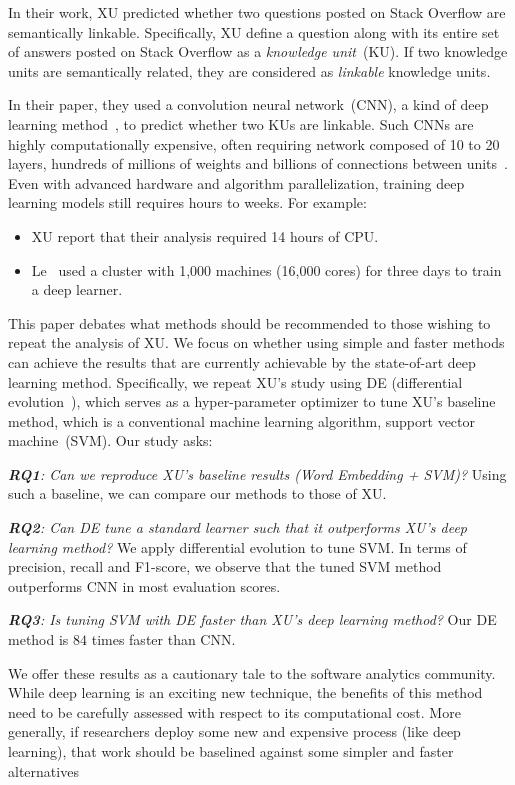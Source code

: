 \documentclass[sigconf]{acmart}
\theoremstyle{break}
\newcommand{\bi}{\begin{itemize}[leftmargin=0.4cm]}
\newcommand{\ei}{\end{itemize}}
\begin{document}
 In their work, XU predicted whether two questions posted on Stack Overflow are semantically linkable. 
Specifically, XU define a question along with its entire set of answers posted on Stack Overflow
as a {\it knowledge unit}~(KU). If two knowledge units are semantically related, they are considered
as {\it linkable} knowledge units. 

In their paper, they used a convolution neural
network~(CNN), a kind of deep learning method~\cite{lecun2015deep}, to predict whether two KUs are linkable. Such 
CNNs are highly computationally expensive,
often requiring network composed of 10 to 20 layers, hundreds of millions of weights and billions of connections between units~\cite{lecun2015deep}. Even with
advanced hardware and algorithm parallelization, training deep learning models still requires hours to weeks.
For example:
\bi
\item
XU report that their analysis
required 14 hours of CPU.
\item
Le~\cite{le2013building} used  a cluster with 1,000 machines (16,000 cores) for three days to train a deep learner.
\ei
 
This paper debates what methods should be recommended
to those wishing to repeat the analysis of XU. We focus on whether using simple and faster methods can achieve
the results that are currently achievable by the state-of-art deep learning method.
Specifically, we repeat XU's
study using  DE  (differential evolution~\cite{storn1997differential}),
which serves as a hyper-parameter optimizer to tune XU's baseline method, which is a conventional machine learning algorithm, support vector machine~(SVM).
Our study asks:


{\it \textbf{RQ1}: Can we reproduce XU's baseline results (Word Embedding + SVM)?}
Using such a baseline, we can compare our methods to those of XU.
 
 {\it \textbf{RQ2}: Can   DE   tune a standard learner such that
 it outperforms
  XU's deep learning method?}
 We apply differential evolution  to tune SVM. In terms of precision, recall and F1-score, we observe that the tuned SVM method outperforms CNN in most evaluation scores.

{\it \textbf{RQ3}: Is tuning SVM with DE faster than XU's deep learning method?}
Our   DE method
 is  $84$ times faster than CNN. 
 
We offer these results as a cautionary tale to the software analytics community.
While deep learning is an exciting new technique, the benefits of this
method need to be carefully assessed with respect to its computational cost. 
More generally,
if researchers deploy some new and expensive process (like deep learning), that work should be baselined against some simpler and faster alternatives
 
\end{document}

